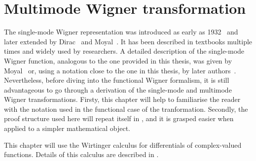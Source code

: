 \chapter{Multimode Wigner transformation}
\label{cha:mm-wigner}

The single-mode Wigner representation was introduced as early as 1932~\cite{Wigner1932} and later extended by Dirac~\cite{Dirac1945} and Moyal~\cite{Moyal1947}.
It has been described in textbooks multiple times and widely used by researchers.
A detailed description of the single-mode Wigner function, analogous to the one provided in this thesis, was given by Moyal~\cite{Moyal1947} or, using a notation close to the one in this thesis, by later authors~\cite{Cahill1969,Hillery1984,Gardiner2004}.
Nevertheless, before diving into the functional Wigner formalism, it is still advantageous to go through a derivation of the single-mode and multimode Wigner transformations.
Firsty, this chapter will help to familiarise the reader with the notation used in the functional case of the tranformation.
Secondly, the proof structure used here will repeat itself in , and it is grasped easier when applied to a simpler mathematical object.

This chapter will use the Wirtinger calculus for differentials of complex-valued functions.
Details of this calculus are described in .





